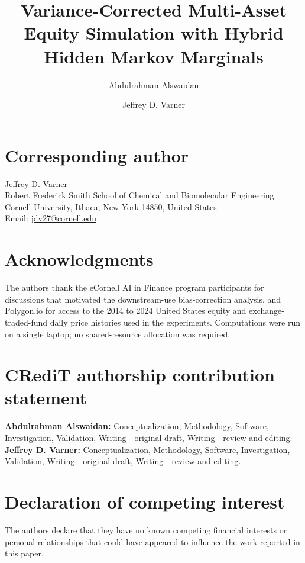 \documentclass[preprint,authoryear]{elsarticle}
\begin{document}
\begin{frontmatter}

\title{Variance-Corrected Multi-Asset Equity Simulation with Hybrid Hidden Markov Marginals}

\author[smith]{Abdulrahman Alswaidan}

\author[smith]{Jeffrey D. Varner}


\end{frontmatter}

\section*{Corresponding author}
Jeffrey D. Varner\\
Robert Frederick Smith School of Chemical and Biomolecular Engineering\\
Cornell University, Ithaca, New York 14850, United States\\
Email: \href{mailto:jdv27@cornell.edu}{jdv27@cornell.edu}

\section*{Acknowledgments}
The authors thank the eCornell AI in Finance program participants for
discussions that motivated the downstream-use bias-correction analysis,
and Polygon.io for access to the 2014 to 2024 United States equity and
exchange-traded-fund daily price histories used in the experiments.
Computations were run on a single laptop; no shared-resource allocation
was required.

\section*{CRediT authorship contribution statement}
\textbf{Abdulrahman Alswaidan:} Conceptualization, Methodology,
Software, Investigation, Validation, Writing - original draft, Writing
- review and editing. \textbf{Jeffrey D. Varner:} Conceptualization,
Methodology, Software, Investigation, Validation, Writing - original
draft, Writing - review and editing.

\section*{Declaration of competing interest}
The authors declare that they have no known competing financial
interests or personal relationships that could have appeared to
influence the work reported in this paper.
\end{document}
